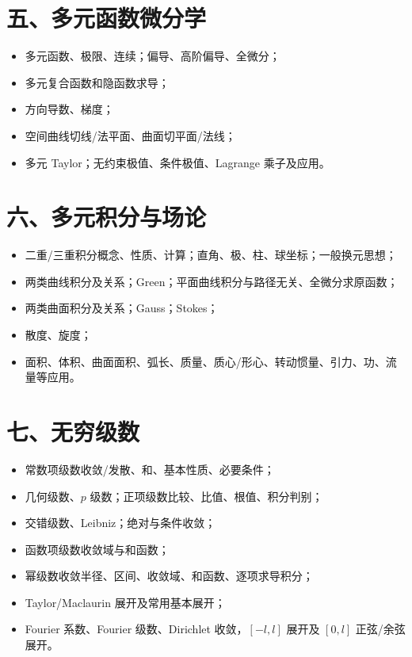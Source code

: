 \documentclass[11pt,a4paper,openany]{ctexbook}
\begin{document}
\section*{五、多元函数微分学}
\begin{itemize}
  \item 多元函数、极限、连续；偏导、高阶偏导、全微分；
  \item 多元复合函数和隐函数求导；
  \item 方向导数、梯度；
  \item 空间曲线切线/法平面、曲面切平面/法线；
  \item 多元 Taylor；无约束极值、条件极值、Lagrange 乘子及应用。
\end{itemize}

\section*{六、多元积分与场论}
\begin{itemize}
  \item 二重/三重积分概念、性质、计算；直角、极、柱、球坐标；一般换元思想；
  \item 两类曲线积分及关系；Green；平面曲线积分与路径无关、全微分求原函数；
  \item 两类曲面积分及关系；Gauss；Stokes；
  \item 散度、旋度；
  \item 面积、体积、曲面面积、弧长、质量、质心/形心、转动惯量、引力、功、流量等应用。
\end{itemize}

\section*{七、无穷级数}
\begin{itemize}
  \item 常数项级数收敛/发散、和、基本性质、必要条件；
  \item 几何级数、$p$ 级数；正项级数比较、比值、根值、积分判别；
  \item 交错级数、Leibniz；绝对与条件收敛；
  \item 函数项级数收敛域与和函数；
  \item 幂级数收敛半径、区间、收敛域、和函数、逐项求导积分；
  \item Taylor/Maclaurin 展开及常用基本展开；
  \item Fourier 系数、Fourier 级数、Dirichlet 收敛，$[-l,l]$ 展开及 $[0,l]$ 正弦/余弦展开。
\end{itemize}
\end{document}
